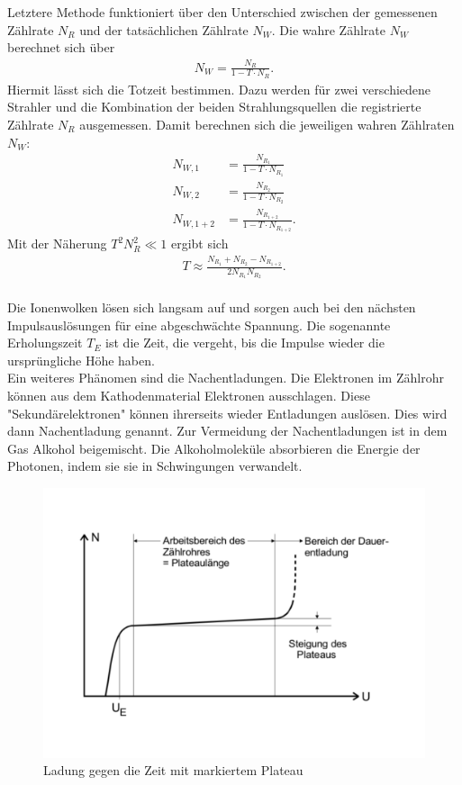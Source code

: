 Letztere Methode funktioniert über den Unterschied zwischen der gemessenen Zählrate $N_{R}$ und der tatsächlichen Zählrate $N_{W}$.
Die wahre Zählrate $N_{W}$ berechnet sich über
\begin{align*}
  N_{W}=\frac{N_{R}}{1-T \cdot N_{R}}.
\end{align*}
Hiermit lässt sich die Totzeit bestimmen.
Dazu werden für zwei verschiedene Strahler und die Kombination der beiden Strahlungsquellen die registrierte Zählrate $N_{R}$ ausgemessen.
Damit berechnen sich die jeweiligen wahren Zählraten $N_{W}$:
\begin{align*}
  N_{W, 1}& =\frac{N_{R_{1}}}{1-T \cdot N_{R_{1}}}\\
  N_{W, 2}& =\frac{N_{R_{2}}}{1-T \cdot N_{R_{2}}}\\
  N_{W, 1+2}& =\frac{N_{R_{1+2}}}{1-T \cdot N_{R_{1+2}}}.
\end{align*}
Mit der Näherung $T^2 N_{R}^2 \ll 1$ ergibt sich
\begin{align}
  T \approx \frac{N_{R_{1}}+N_{R_{2}}-N_{R_{1+2}}}{2 N_{R_{1}} N_{R_{2}}}.
  \label{eqn:T}
\end{align}
\\Die Ionenwolken lösen sich langsam auf und sorgen auch bei den nächsten Impulsauslösungen für eine abgeschwächte Spannung.
Die sogenannte Erholungszeit $T_{E}$ ist die Zeit, die vergeht, bis die Impulse wieder die ursprüngliche Höhe haben.
\\Ein weiteres Phänomen sind die Nachentladungen.
Die Elektronen im Zählrohr können aus dem Kathodenmaterial Elektronen ausschlagen.
Diese "Sekundärelektronen" können ihrerseits wieder Entladungen auslösen.
Dies wird dann Nachentladung genannt.
Zur Vermeidung der Nachentladungen ist in dem Gas Alkohol beigemischt.
Die Alkoholmoleküle absorbieren die Energie der Photonen, indem sie sie in Schwingungen verwandelt.
\begin{figure}[h!]
  \centering
  \includegraphics[width=\textwidth]{703plateau.pdf}
  \caption{Ladung gegen die Zeit mit markiertem Plateau \cite{1}}
  \label{fig:plateau}
\end{figure}
